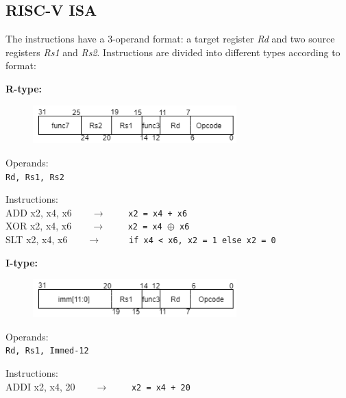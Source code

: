 \subsection{RISC-V ISA}
The instructions have a 3-operand format: a target register \textit{Rd} and two source registers \textit{Rs1} and \textit{Rs2}. Instructions are divided into different types according to format:\\

\begin{description}
	\item \textbf{R-type:}
  \begin{figure}[h]
    \center
    \includegraphics[width=0.7\textwidth]{sec1/images/Rtype.png}
  \end{figure}
	\begin{description}
		\item Operands:\\
		\texttt{Rd, Rs1, Rs2}
		\item Instructions:\\
		\textsf{ADD x2, x4, x6}\ \ \ \ $\longrightarrow$ \ \ \ \ \texttt{x2 = x4 + x6} \\
    \textsf{XOR x2, x4, x6}\ \ \ \ $\longrightarrow$ \ \ \ \ \texttt{x2 = x4 $\oplus$ x6} \\
    \textsf{SLT x2, x4, x6}\ \ \ \ $\longrightarrow$ \ \ \ \ \texttt{ if x4 < x6, x2 = 1 else x2 = 0}
	\end{description}
	\item \textbf{I-type:}
  \begin{figure}[h]
    \center
    \includegraphics[width=0.7\textwidth]{sec1/images/Itype.png}
  \end{figure}
	\begin{description}
		\item Operands:\\
		\texttt{Rd, Rs1, Immed-12}
		\item Instructions:\\
		\textsf{ADDI x2, x4, 20}\ \ \ \ $\longrightarrow$ \ \ \ \ \texttt{x2 = x4 + 20} \\

\end{description}
\end{description}
